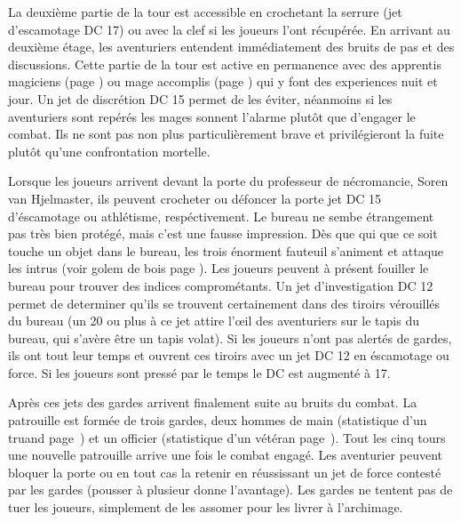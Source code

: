 La deuxième partie de la tour est accessible en crochetant la serrure (jet d'escamotage DC 17) ou avec
la clef si les joueurs l'ont récupérée. En arrivant au deuxième étage, les aventuriers entendent 
immédiatement des bruits de pas et des discussions. Cette partie de la tour est active en permanence avec
des apprentis magiciens (page \pageref{ApprentiMage}) ou mage accomplis (page \pageref{Mage}) qui y font 
des experiences nuit et jour. Un jet de discrétion DC 15 permet de les éviter, néanmoins si les 
aventuriers sont repérés les mages sonnent l'alarme plutôt que d'engager le combat. Ils ne sont pas non plus
particulièrement brave et privilégieront la fuite plutôt qu'une confrontation mortelle.

Lorsque les joueurs arrivent devant la porte du professeur de nécromancie, Soren van Hjelmaster, ils
peuvent crocheter ou défoncer la porte jet DC 15 d'éscamotage ou athlétisme, respéctivement. Le bureau
ne sembe étrangement pas très bien protégé, mais c'est une fausse impression. Dès que qui que ce soit
touche un objet dans le bureau, les trois énorment fauteuil s'animent et attaque les intrus (voir golem
de bois page \pageref{GolemBois}). Les joueurs peuvent à présent fouiller le bureau pour trouver des 
indices comprométants. Un jet d'investigation DC 12 permet de determiner qu'ils se trouvent certainement
dans des tiroirs vérouillés du bureau (un 20 ou plus à ce jet attire l'\oe{}il des aventuriers sur le tapis
du bureau, qui s'avère être un tapis volat). Si les joueurs n'ont pas alertés de gardes, ils ont tout leur 
temps et ouvrent ces tiroirs avec un jet DC 12 en éscamotage ou force. Si les joueurs sont pressé par 
le temps le DC est augmenté à 17. 

Après ces jets des gardes arrivent finalement suite au bruits du combat. La patrouille est formée de
trois gardes, deux hommes de main (statistique d'un truand page~\pageref{Truand}) et un officier 
(statistique d'un vétéran page~\pageref{Veteran}). Tout les cinq tours une nouvelle patrouille arrive une
fois le combat engagé. Les aventurier peuvent bloquer la porte ou en tout cas la retenir en réussissant
un jet de force contesté par les gardes (pousser à plusieur donne l'avantage). Les gardes ne tentent pas 
de tuer les joueurs, simplement de les assomer pour les livrer à l'archimage.

